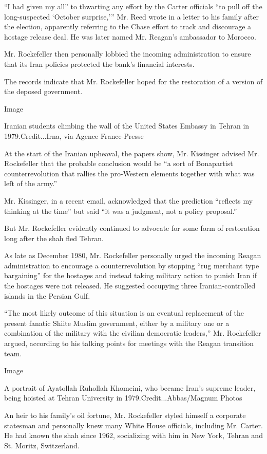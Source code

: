 ``I had given my all'' to thwarting any effort by the Carter officials
``to pull off the long-suspected `October surprise,''' Mr. Reed wrote in
a letter to his family after the election, apparently referring to the
Chase effort to track and discourage a hostage release deal. He was
later named Mr. Reagan's ambassador to Morocco.

Mr. Rockefeller then personally lobbied the incoming administration to
ensure that its Iran policies protected the bank's financial interests.

The records indicate that Mr. Rockefeller hoped for the restoration of a
version of the deposed government.

Image

Iranian students climbing the wall of the United States Embassy in
Tehran in 1979.Credit...Irna, via Agence France-Presse

At the start of the Iranian upheaval, the papers show, Mr. Kissinger
advised Mr. Rockefeller that the probable conclusion would be ``a sort
of Bonapartist counterrevolution that rallies the pro-Western elements
together with what was left of the army.''

Mr. Kissinger, in a recent email, acknowledged that the prediction
``reflects my thinking at the time'' but said ``it was a judgment, not a
policy proposal.''

But Mr. Rockefeller evidently continued to advocate for some form of
restoration long after the shah fled Tehran.

As late as December 1980, Mr. Rockefeller personally urged the incoming
Reagan administration to encourage a counterrevolution by stopping ``rug
merchant type bargaining'' for the hostages and instead taking military
action to punish Iran if the hostages were not released. He suggested
occupying three Iranian-controlled islands in the Persian Gulf.

``The most likely outcome of this situation is an eventual replacement
of the present fanatic Shiite Muslim government, either by a military
one or a combination of the military with the civilian democratic
leaders,'' Mr. Rockefeller argued, according to his talking points for
meetings with the Reagan transition team.

Image

A portrait of Ayatollah Ruhollah Khomeini, who became Iran's supreme
leader, being hoisted at Tehran University in 1979.Credit...Abbas/Magnum
Photos

An heir to his family's oil fortune, Mr. Rockefeller styled himself a
corporate statesman and personally knew many White House officials,
including Mr. Carter. He had known the shah since 1962, socializing with
him in New York, Tehran and St. Moritz, Switzerland.

